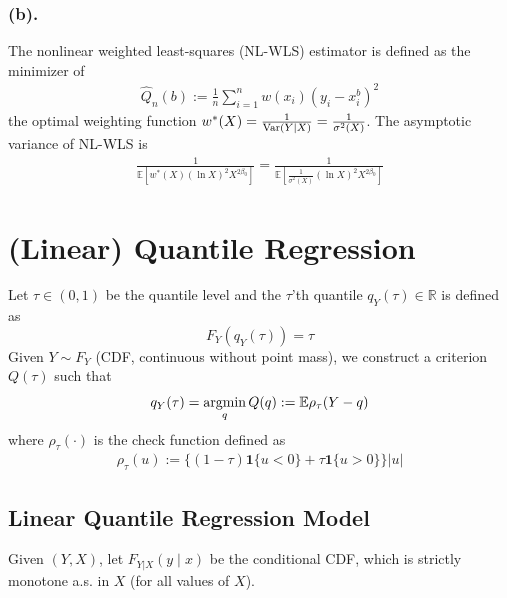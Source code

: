 \documentclass[11pt]{elegantbook}
\newcommand{\argmin}{\operatornamewithlimits{argmin}}
\begin{document}
\subsubsection*{(b).}
The nonlinear weighted least-squares (NL-WLS) estimator is defined as the minimizer of
\begin{equation}
    \begin{aligned}
        \hat{Q}_n(b):=\frac{1}{n}\sum_{i=1}^n w(x_i)(y_i-x_i^{b})^2
    \end{aligned}
    \nonumber
\end{equation}
the optimal weighting function $w^*(X)=\frac{1}{\textnormal{Var}(Y|X)}=\frac{1}{\sigma^2(X)}$. The asymptotic variance of NL-WLS is
\begin{equation}
    \begin{aligned}
        \frac{1}{\mathbb{E}[w^*(X)(\ln X)^2 X^{2\beta_0}]}=\frac{1}{\mathbb{E}[\frac{1}{\sigma^2(X)}(\ln X)^2 X^{2\beta_0}]}
    \end{aligned}
    \nonumber
\end{equation}


\section{(Linear) Quantile Regression}
Let $\tau\in(0,1)$ be the quantile level and the $\tau$'th quantile $q_Y(\tau)\in \mathbb{R}$ is defined as $$F_Y(q_Y(\tau))=\tau$$
Given $Y\sim F_Y$ (CDF, continuous without point mass), we construct a criterion $Q(\tau)$ such that
\begin{equation}
    \begin{aligned}
        q_Y(\tau)=\argmin_q Q(q):=\mathbb{E}\rho_\tau(Y-q)
    \end{aligned}
    \nonumber
\end{equation}
where $\rho_\tau(\cdot)$ is the check function defined as
\begin{equation}
    \begin{aligned}
        \rho_\tau(u):=\{(1-\tau)\mathbf{1}\{u<0\}+\tau\mathbf{1}\{u>0\}\}|u|
    \end{aligned}
    \nonumber
\end{equation}

\subsection{Linear Quantile Regression Model}
Given $(Y,X)$, let $F_{Y|X}(y\mid x)$ be the conditional CDF, which is strictly monotone a.s. in $X$ (for all values of $X$).
\end{document}
